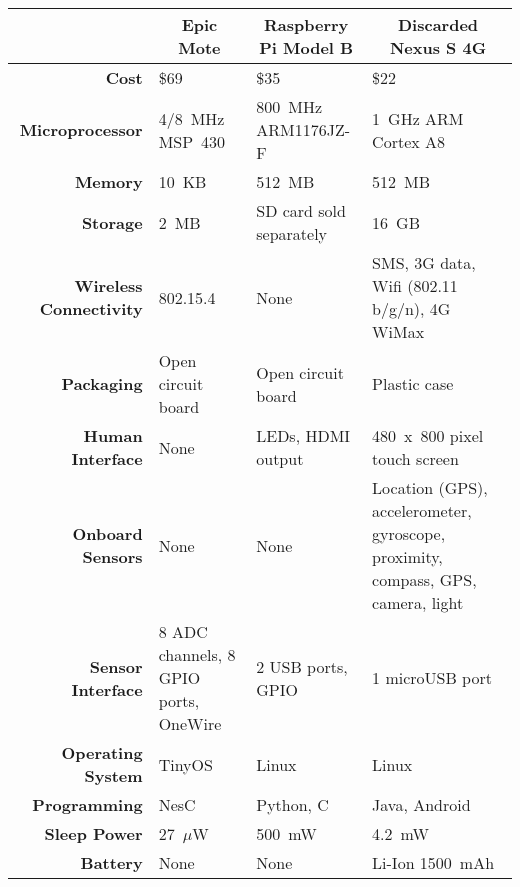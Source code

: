 \renewcommand{\arraystretch}{1.2}
\begin{table*}[t]
\begin{threeparttable}
{\footnotesize
\begin{tabularx}{\textwidth}{rXXX}

&
\multicolumn{1}{c}{\textbf{Epic Mote}} &
\multicolumn{1}{c}{\textbf{Raspberry Pi Model B}} &
\multicolumn{1}{c}{\textbf{Discarded Nexus S 4G}} \\ \toprule

\textbf{Cost} &
\$69 &
\$35 &
\$22\tnote{1} \\ \midrule

\textbf{Microprocessor} &
4/8~MHz MSP~430 &
800~MHz\tnote{2} ARM1176JZ-F &
1~GHz\tnote{2} ARM Cortex A8 \\

\textbf{Memory} &
10~KB &
512~MB &
512~MB \\

\textbf{Storage} &
2~MB &
SD card sold separately\tnote{3} &
16~GB \\ \midrule

\textbf{Wireless Connectivity} &
802.15.4 &
None &
SMS, 3G data, Wifi (802.11 b/g/n), 4G WiMax \\ \midrule

\textbf{Packaging} &
Open circuit board &
Open circuit board &
Plastic case \\

\textbf{Human Interface} &
None &
LEDs, HDMI output &
480~x~800 pixel touch screen \\ \midrule

\textbf{Onboard Sensors} &
None &
None &
Location (GPS), accelerometer, gyroscope, proximity, compass, GPS, camera,
light \\

\textbf{Sensor Interface} &
8 ADC channels, 8 GPIO ports, OneWire &
2 USB ports, GPIO &
1 microUSB port \\ \midrule

\textbf{Operating System} &
TinyOS &
Linux &
Linux \\

\textbf{Programming} &
NesC &
Python, C &
Java, Android \\ \midrule


\textbf{Sleep Power} &
27~$\mu$W &
500~mW\tnote{4} &
4.2~mW \\

\textbf{Battery} &
None &
None &
Li-Ion 1500~mAh \\ \midrule


\end{tabularx}}
\end{threeparttable}
\end{table*}
